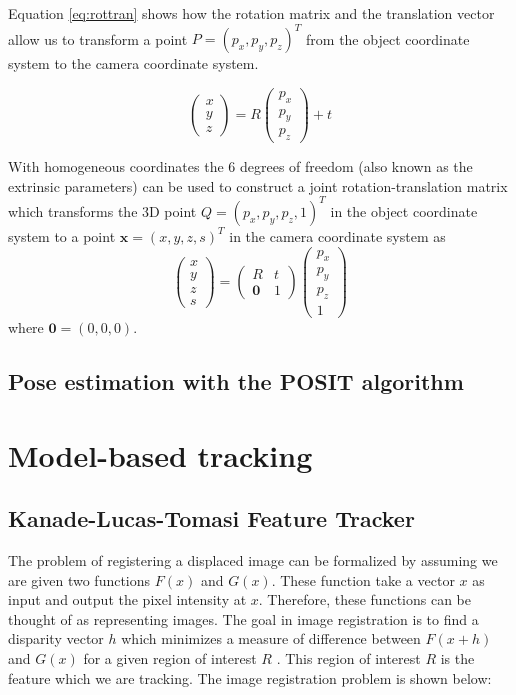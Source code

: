 \documentclass[11pt,a4paper]{report}
\begin{document}
Equation \ref{eq:rottran} shows how the rotation matrix and the translation vector allow us to transform a point $P
= (p_x,p_y,p_z)^T$
from the object coordinate system to the camera coordinate system. 

\begin{equation}\label{eq:rottran}
\begin{pmatrix}x\\y\\z\end{pmatrix} =
  R\begin{pmatrix}p_x\\p_y\\p_z\end{pmatrix} + t
\end{equation}

With homogeneous coordinates the 6 degrees of freedom (also known as the
extrinsic parameters) can be used to
construct a joint rotation-translation matrix which transforms the 3D point
$Q = (p_x,p_y,p_z,1)^T$ in the object coordinate system to a point $\mathbf{x}
= (x,y,z,s)^T$ in the camera coordinate system as
\begin{equation}\label{eq:jointrottran}
\begin{pmatrix}x\\y\\z\\s\end{pmatrix} =
  \begin{pmatrix}R&t\\\mathbf{0}&1\end{pmatrix}\begin{pmatrix}p_x\\p_y\\p_z\\1\end{pmatrix}
\end{equation}
where $\mathbf{0} = (0,0,0)$. 


\subsection{Pose estimation with the POSIT algorithm}


\section{Model-based tracking}

\subsection{Kanade-Lucas-Tomasi Feature Tracker}
The problem of registering a displaced image can be formalized by assuming we
are given two functions $F(x)$ and $G(x)$. These function take a vector $x$ as input
and output the pixel intensity at $x$. Therefore, these functions can be thought
of as representing images. 
The goal in image registration is to find a disparity vector $h$ which minimizes
a measure of difference between $F(x + h)$ and $G(x)$ for a given region of
interest $R$ \cite{kanade}. This region of interest $R$ is the feature which we
are tracking. The image registration problem is shown below:
\end{document}
